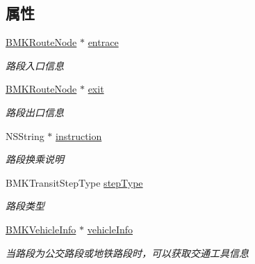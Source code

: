 \subsection*{属性}
\begin{DoxyCompactItemize}
\item 
\hypertarget{interface_b_m_k_transit_step_a8241c007efc75882537c83cf7c49d403}{\hyperlink{interface_b_m_k_route_node}{B\+M\+K\+Route\+Node} $\ast$ \hyperlink{interface_b_m_k_transit_step_a8241c007efc75882537c83cf7c49d403}{entrace}}\label{interface_b_m_k_transit_step_a8241c007efc75882537c83cf7c49d403}

\begin{DoxyCompactList}\small\item\em 路段入口信息 \end{DoxyCompactList}\item 
\hypertarget{interface_b_m_k_transit_step_ab3971103f9cd325a79712eaa09e341f5}{\hyperlink{interface_b_m_k_route_node}{B\+M\+K\+Route\+Node} $\ast$ \hyperlink{interface_b_m_k_transit_step_ab3971103f9cd325a79712eaa09e341f5}{exit}}\label{interface_b_m_k_transit_step_ab3971103f9cd325a79712eaa09e341f5}

\begin{DoxyCompactList}\small\item\em 路段出口信息 \end{DoxyCompactList}\item 
\hypertarget{interface_b_m_k_transit_step_abb426a15b7ebf35ea6a7aacb87023391}{N\+S\+String $\ast$ \hyperlink{interface_b_m_k_transit_step_abb426a15b7ebf35ea6a7aacb87023391}{instruction}}\label{interface_b_m_k_transit_step_abb426a15b7ebf35ea6a7aacb87023391}

\begin{DoxyCompactList}\small\item\em 路段换乘说明 \end{DoxyCompactList}\item 
\hypertarget{interface_b_m_k_transit_step_a19dc0d26a9b5908704fea8d9a2ea3328}{B\+M\+K\+Transit\+Step\+Type \hyperlink{interface_b_m_k_transit_step_a19dc0d26a9b5908704fea8d9a2ea3328}{step\+Type}}\label{interface_b_m_k_transit_step_a19dc0d26a9b5908704fea8d9a2ea3328}

\begin{DoxyCompactList}\small\item\em 路段类型 \end{DoxyCompactList}\item 
\hypertarget{interface_b_m_k_transit_step_aa8fd99fdc509dbccab356e9388974978}{\hyperlink{interface_b_m_k_vehicle_info}{B\+M\+K\+Vehicle\+Info} $\ast$ \hyperlink{interface_b_m_k_transit_step_aa8fd99fdc509dbccab356e9388974978}{vehicle\+Info}}\label{interface_b_m_k_transit_step_aa8fd99fdc509dbccab356e9388974978}

\begin{DoxyCompactList}\small\item\em 当路段为公交路段或地铁路段时，可以获取交通工具信息 \end{DoxyCompactList}\end{DoxyCompactItemize}


